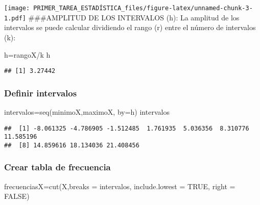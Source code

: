 \documentclass[
]{article}
\newenvironment{Shaded}{\begin{snugshade}}{\end{snugshade}}
\newcommand{\AttributeTok}[1]{\textcolor[rgb]{0.77,0.63,0.00}{#1}}
\newcommand{\ConstantTok}[1]{\textcolor[rgb]{0.00,0.00,0.00}{#1}}
\newcommand{\FunctionTok}[1]{\textcolor[rgb]{0.00,0.00,0.00}{#1}}
\newcommand{\NormalTok}[1]{#1}
\newcommand{\OtherTok}[1]{\textcolor[rgb]{0.56,0.35,0.01}{#1}}
\newcommand{\SpecialCharTok}[1]{\textcolor[rgb]{0.00,0.00,0.00}{#1}}
\begin{document}
\texttt{[image: PRIMER\_TAREA\_ESTADÍSTICA\_files/figure-latex/unnamed-chunk-3-1.pdf]}
\#\#\#AMPLITUD DE LOS INTERVALOS (h): La amplitud de los intervalos se
puede calcular dividiendo el rango (r) entre el número de intervalos
(k):

\begin{Shaded}
\begin{Highlighting}[]
\NormalTok{h}\OtherTok{=}\NormalTok{rangoX}\SpecialCharTok{/}\NormalTok{k}
\NormalTok{h}
\end{Highlighting}
\end{Shaded}

\begin{verbatim}
## [1] 3.27442
\end{verbatim}

\hypertarget{definir-intervalos}{%
\subsubsection{Definir intervalos}\label{definir-intervalos}}

\begin{Shaded}
\begin{Highlighting}[]
\NormalTok{intervalos}\OtherTok{=}\FunctionTok{seq}\NormalTok{(minimoX,maximoX, }\AttributeTok{by=}\NormalTok{h)}
\NormalTok{intervalos}
\end{Highlighting}
\end{Shaded}

\begin{verbatim}
##  [1] -8.061325 -4.786905 -1.512485  1.761935  5.036356  8.310776 11.585196
##  [8] 14.859616 18.134036 21.408456
\end{verbatim}

\hypertarget{crear-tabla-de-frecuencia}{%
\subsubsection{Crear tabla de
frecuencia}\label{crear-tabla-de-frecuencia}}

\begin{Shaded}
\begin{Highlighting}[]
\NormalTok{frecuenciasX}\OtherTok{=}\FunctionTok{cut}\NormalTok{(X,}\AttributeTok{breaks =}\NormalTok{ intervalos, }\AttributeTok{include.lowest =} \ConstantTok{TRUE}\NormalTok{, }\AttributeTok{right =} \ConstantTok{FALSE}\NormalTok{) }
\end{Highlighting}
\end{Shaded}
\end{document}
